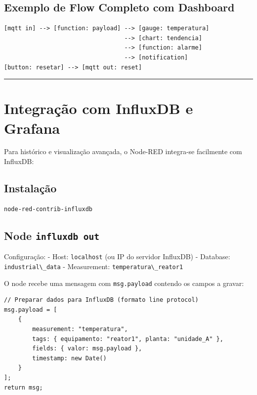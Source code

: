 \subsection{Exemplo de Flow Completo com Dashboard}\label{exemplo-de-flow-completo-com-dashboard}

\begin{lstlisting}
[mqtt in] --> [function: payload] --> [gauge: temperatura]
                                  --> [chart: tendencia]
                                  --> [function: alarme]
                                  --> [notification]
[button: resetar] --> [mqtt out: reset]
\end{lstlisting}

\begin{center}\rule{0.5\linewidth}{0.5pt}\end{center}

\section{Integração com InfluxDB e Grafana}\label{integrauxe7uxe3o-com-influxdb-e-grafana}

Para histórico e visualização avançada, o Node-RED integra-se facilmente com InfluxDB:

\subsection{Instalação}\label{instalauxe7uxe3o-1}

\begin{lstlisting}
node-red-contrib-influxdb
\end{lstlisting}

\subsection{\texorpdfstring{Node \texttt{influxdb\ out}}{Node influxdb out}}\label{node-influxdb-out}

Configuração:
- Host: \passthrough{\lstinline!localhost!} (ou IP do servidor InfluxDB)
- Database: \passthrough{\lstinline!industrial\_data!}
- Measurement: \passthrough{\lstinline!temperatura\_reator1!}

O node recebe uma mensagem com \passthrough{\lstinline!msg.payload!} contendo os campos a gravar:

\begin{lstlisting}
// Preparar dados para InfluxDB (formato line protocol)
msg.payload = [
    {
        measurement: "temperatura",
        tags: { equipamento: "reator1", planta: "unidade_A" },
        fields: { valor: msg.payload },
        timestamp: new Date()
    }
];
return msg;
\end{lstlisting}

